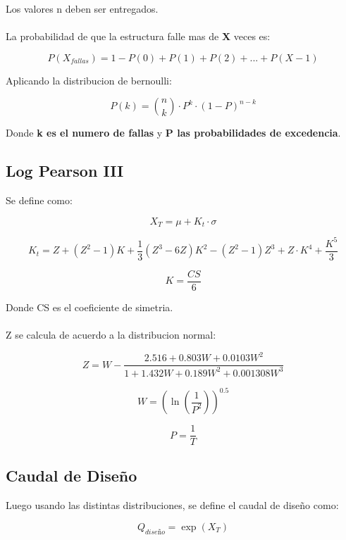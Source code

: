 Los valores n deben ser entregados.
\\ \\
La probabilidad de que la estructura falle mas de \textbf{X} veces es:

\begin{equation}
    P(X_{fallas}) = 1 - P(0) + P(1) + P(2) + ... + P(X-1)
\end{equation}

Aplicando la distribucion de bernoulli:

\begin{equation}
    P(k) = \binom{n}{k} \cdot P^k \cdot (1-P)^{n-k}
\end{equation}

Donde \textbf{k es el numero de fallas} y \textbf{P las probabilidades de excedencia}.

\subsection{Log Pearson III}

Se define como:

\begin{equation}
    X_T = \mu + K_t \cdot \sigma
\end{equation}

\begin{equation}
    K_t = Z + (Z^2 - 1)K + \frac{1}{3}(Z^3 - 6Z)K^2 - (Z^2-1)Z^3 + Z\cdot K^4 + \frac{K^5}{3}
\end{equation}

\begin{equation}
    K = \frac{CS}{6}
\end{equation}

Donde CS es el coeficiente de simetria.
\\ \\
Z se calcula de acuerdo a la distribucion normal:

\begin{equation}
    Z = W -  \frac{2.516 + 0.803W + 0.0103W^2}{1 + 1.432W + 0.189W^2 + 0.001308W^3}
\end{equation}

\begin{equation}
    W = (\ln(\frac{1}{P^2}))^{0.5}
\end{equation}

\begin{equation}
    P = \frac{1}{T}
\end{equation}

\subsection{Caudal de Diseño}

Luego usando las distintas distribuciones, se define el caudal de diseño como:

\begin{equation}
    Q_{diseño} = \exp(X_T)
\end{equation}